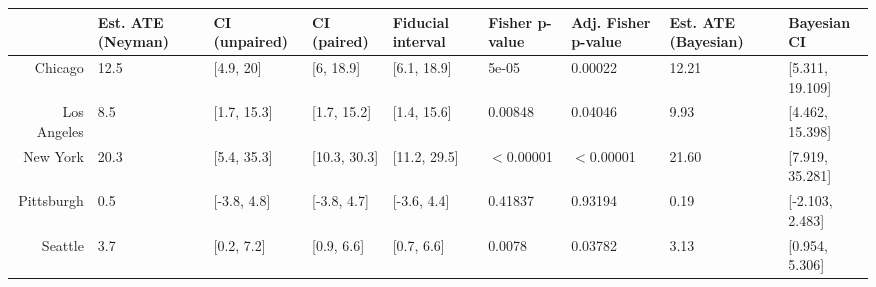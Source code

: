 \begin{table}[ht]
\centering
\begin{tabular}{rllllllll}
  \hline
 & Est. ATE (Neyman) & CI (unpaired) & CI (paired) & Fiducial interval & Fisher p-value & Adj. Fisher p-value & Est. ATE (Bayesian) & Bayesian CI \\ 
  \hline
Chicago & 12.5 & [4.9, 20] & [6, 18.9] & [6.1, 18.9] & 5e-05 & 0.00022 & 12.21 & [5.311, 19.109] \\ 
  Los Angeles &  8.5 & [1.7, 15.3] & [1.7, 15.2] & [1.4, 15.6] & 0.00848 & 0.04046 &  9.93 & [4.462, 15.398] \\ 
  New York & 20.3 & [5.4, 35.3] & [10.3, 30.3] & [11.2, 29.5] & $<$0.00001 & $<$0.00001 & 21.60 & [7.919, 35.281] \\ 
  Pittsburgh &  0.5 & [-3.8, 4.8] & [-3.8, 4.7] & [-3.6, 4.4] & 0.41837 & 0.93194 &  0.19 & [-2.103, 2.483] \\ 
  Seattle &  3.7 & [0.2, 7.2] & [0.9, 6.6] & [0.7, 6.6] & 0.0078 & 0.03782 &  3.13 & [0.954, 5.306] \\ 
   \hline
\end{tabular}
\end{table}
